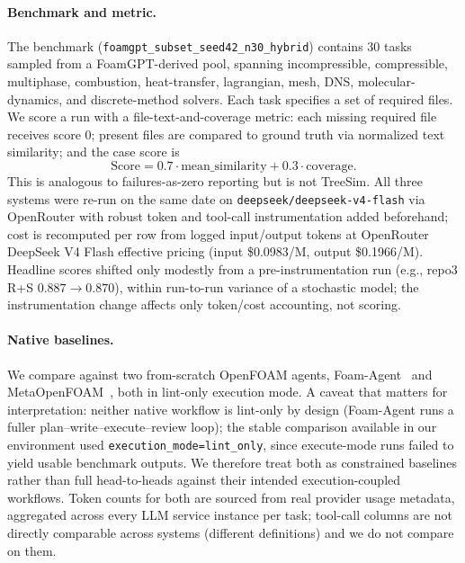 \documentclass{article}
\begin{document}
\paragraph{Benchmark and metric.}
The benchmark (\texttt{foamgpt\_subset\_seed42\_n30\_hybrid}) contains 30 tasks sampled from a FoamGPT-derived pool, spanning incompressible, compressible, multiphase, combustion, heat-transfer, lagrangian, mesh, DNS, molecular-dynamics, and discrete-method solvers. Each task specifies a set of required files. We score a run with a file-text-and-coverage metric: each missing required file receives score 0; present files are compared to ground truth via normalized text similarity; and the case score is
\[
\mathrm{Score} = 0.7 \cdot \mathrm{mean\_similarity} + 0.3 \cdot \mathrm{coverage}.
\]
This is analogous to failures-as-zero reporting but is not TreeSim. All three systems were re-run on the same date on \texttt{deepseek/deepseek-v4-flash} via OpenRouter with robust token and tool-call instrumentation added beforehand; cost is recomputed per row from logged input/output tokens at OpenRouter DeepSeek V4 Flash effective pricing (input \$0.0983/M, output \$0.1966/M). Headline scores shifted only modestly from a pre-instrumentation run (e.g., repo3 R+S $0.887\to0.870$), within run-to-run variance of a stochastic model; the instrumentation change affects only token/cost accounting, not scoring.

\paragraph{Native baselines.}
We compare against two from-scratch OpenFOAM agents, Foam-Agent~\citep{foamagent2025} and MetaOpenFOAM~\citep{chen2024metaopenfoam}, both in lint-only execution mode. A caveat that matters for interpretation: neither native workflow is lint-only by design (Foam-Agent runs a fuller plan--write--execute--review loop); the stable comparison available in our environment used \texttt{execution\_mode=lint\_only}, since execute-mode runs failed to yield usable benchmark outputs. We therefore treat both as constrained baselines rather than full head-to-heads against their intended execution-coupled workflows. Token counts for both are sourced from real provider usage metadata, aggregated across every LLM service instance per task; tool-call columns are not directly comparable across systems (different definitions) and we do not compare on them.
\end{document}
